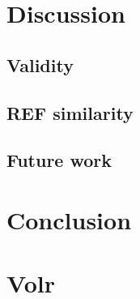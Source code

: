 \documentclass[a4paper,oneside]{memoir}
\begin{document}
\chapter{Discussion}
  \section{Validity}
  \section{REF similarity}
  \section{Future work}

\chapter{Conclusion}

\printbibliography

\printglossary
\printindex

\appendix
\chapter{Volr} \label{appendix:volr}
  
\end{document}
